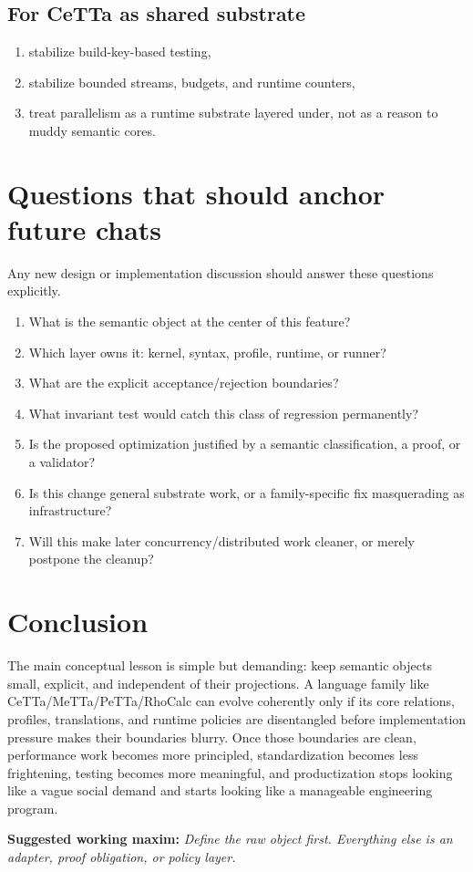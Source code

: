 \documentclass[11pt]{article}
\begin{document}
\subsection{For CeTTa as shared substrate}
\begin{enumerate}
  \item stabilize build-key-based testing,
  \item stabilize bounded streams, budgets, and runtime counters,
  \item treat parallelism as a runtime substrate layered under, not as a reason to muddy semantic cores.
\end{enumerate}

\section{Questions that should anchor future chats}
Any new design or implementation discussion should answer these questions explicitly.

\begin{enumerate}
  \item What is the semantic object at the center of this feature?
  \item Which layer owns it: kernel, syntax, profile, runtime, or runner?
  \item What are the explicit acceptance/rejection boundaries?
  \item What invariant test would catch this class of regression permanently?
  \item Is the proposed optimization justified by a semantic classification, a proof, or a validator?
  \item Is this change general substrate work, or a family-specific fix masquerading as infrastructure?
  \item Will this make later concurrency/distributed work cleaner, or merely postpone the cleanup?
\end{enumerate}

\section{Conclusion}
The main conceptual lesson is simple but demanding: keep semantic objects small, explicit, and independent of their projections. A language family like CeTTa/MeTTa/PeTTa/RhoCalc can evolve coherently only if its core relations, profiles, translations, and runtime policies are disentangled before implementation pressure makes their boundaries blurry. Once those boundaries are clean, performance work becomes more principled, standardization becomes less frightening, testing becomes more meaningful, and productization stops looking like a vague social demand and starts looking like a manageable engineering program.

\bigskip
\noindent\textbf{Suggested working maxim:} \emph{Define the raw object first. Everything else is an adapter, proof obligation, or policy layer.}
\end{document}
